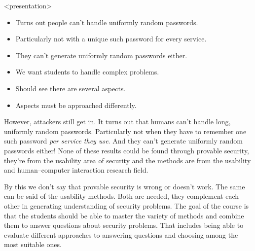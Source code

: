 \begin{frame}<presentation>
  \begin{example}[Usability]
    \begin{itemize}
      \item Turns out people can't handle uniformly random passwords.
      \item Particularly not with a unique such password for every service.
      \item They can't generate uniformly random passwords either.
    \end{itemize}
  \end{example}

  \pause

  \begin{remark}
    \begin{itemize}
      \item We want students to handle complex problems.
      \item Should see there are several aspects.
      \item Aspects must be approached differently.
    \end{itemize}
  \end{remark}
\end{frame}

However, attackers still get in.
It turns out that humans can't handle long, uniformly random passwords.
Particularly not when they have to remember one such password \emph{per service 
they use}.
And they can't generate uniformly random passwords either!
None of these results could be found through provable security, they're from 
the usability area of security and the methods are from the usability and 
human--computer interaction research field.

By this we don't say that provable security is wrong or doesn't work.
The same can be said of the usability methods.
Both are needed, they complement each other in generating understanding of 
security problems.
The goal of the course is that the students should be able to master the 
variety of methods and combine them to answer questions about security 
problems.
That includes being able to evaluate different approaches to answering 
questions and choosing among the most suitable ones.


